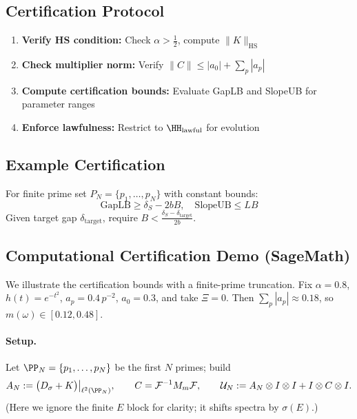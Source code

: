 \documentclass[12]{amsart}
\theoremstyle{plain}
\begin{document}
\subsection{Certification Protocol}

\begin{enumerate}
    \item \textbf{Verify HS condition:} Check $\alpha > \frac12$, compute $\|K\|_{\text{HS}}$
    \item \textbf{Check multiplier norm:} Verify $\|C\| \leq |a_0| + \sum_p |a_p|$  
    \item \textbf{Compute certification bounds:} Evaluate GapLB and SlopeUB for parameter ranges
    \item \textbf{Enforce lawfulness:} Restrict to $\HH_{\text{lawful}}$ for evolution
\end{enumerate}

\subsection{Example Certification}

For finite prime set $P_N = \{p_1, \dots, p_N\}$ with constant bounds:
\[
\text{GapLB} \geq \delta_S - 2bB,\quad \text{SlopeUB} \leq LB
\]
Given target gap $\delta_{\text{target}}$, require $B < \frac{\delta_S - \delta_{\text{target}}}{2b}$.
\subsection{Computational Certification Demo (SageMath)}\label{subsec:computational-demo}

We illustrate the certification bounds with a finite-prime truncation.
Fix $\alpha=0.8$, $h(t)=e^{-t^2}$, $a_p=0.4\,p^{-2}$, $a_0=0.3$, and take $\Xi=0$.
Then $\sum_p|a_p|\approx0.18$, so $m(\omega)\in[0.12,0.48]$.

\paragraph{Setup.}
Let $\PP_N=\{p_1,\dots,p_N\}$ be the first $N$ primes; build
\[
A_N:=\big(D_\sigma+K\big)\big|_{\ell^2(\PP_N)},\qquad
C=\mathcal F^{-1}M_m\mathcal F,\qquad
\mathcal U_N:=A_N\otimes I\otimes I+I\otimes C\otimes I.
\]
(Here we ignore the finite $E$ block for clarity; it shifts spectra by $\sigma(E)$.)
\end{document}
